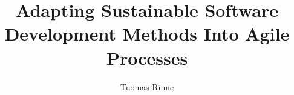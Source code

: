 \documentclass[language=english,version=draft,mainfont=none,sharelatex=false]{utuftthesis}
\providecommand{\algorithmname}{Algoritmi}
\begin{document}
\title{Adapting Sustainable Software Development Methods Into Agile Processes}
\author{Tuomas Rinne}

\maketitle


\tableofcontents

\listoffigures

\listoftables

\listofacronyms

\printglossary

\renewcommand{\algorithmname}{\listingscaption}











\printbibliography

\end{document}
